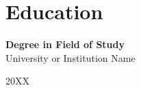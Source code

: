 \documentclass[11pt, letterpaper]{article}
\newenvironment{twocolentry}[2][]{
    \onecolentry
    \def\secondColumn{#2}
    \setcolumnwidth{\fill, 4.5 cm}
    \begin{paracol}{2}
}{
    \switchcolumn \raggedleft \secondColumn
    \end{paracol}
    \endonecolentry
} %
\begin{document}
    \section{Education}
    \begin{twocolentry}{20XX}
        \textbf{Degree in Field of Study}\\[0.2cm]
        University or Institution Name
    \end{twocolentry}
\end{document}
